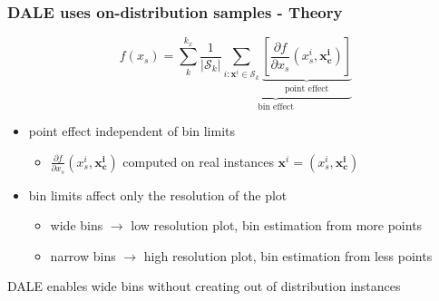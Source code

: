\documentclass{beamer}
\newcommand{\xb}{\boldsymbol{x}}
\begin{document}
\begin{frame}
  \frametitle{DALE uses on-distribution samples - Theory}
  \[f(x_s) = \sum_k^{k_x} \underbrace{\frac{1}{|\mathcal{S}_k|}
      \sum_{i:\xb^i \in \mathcal{S}_k} \underbrace{[\frac{\partial
          f}{\partial x_s}(x_s^i, \bm{x^i_c})]}_{\text{point
          effect}}}_{\text{bin effect}} \]

  \begin{itemize}
  \item point effect \alert{independent} of bin limits
    \begin{itemize}
    \item \(\frac{\partial f}{\partial x_s}(x_s^i, \bm{x^i_c})\)
      computed on real instances \(\bm{x}^i = (x_s^i, \bm{x_c^i})\)
    \end{itemize}
  \item bin limits affect only the \alert{resolution} of the plot
    \begin{itemize}
    \item wide bins \(\rightarrow\) low resolution plot, bin
      estimation from more points
    \item narrow bins \(\rightarrow\) high resolution plot, bin
      estimation from less points
    \end{itemize}
  \end{itemize}
  \noindent\makebox[\linewidth]{\rule{\paperwidth}{0.4pt}}
  DALE enables wide bins without creating out of distribution instances
\end{frame}
\end{document}
